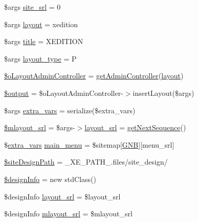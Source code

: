 \begin{DoxyCompactItemize}
\$args \hyperlink{ko_8install_8php_a8b1406b4ad1048041558dce6bfe89004}{site\+\_\+srl} = 0
\item 
\$args \hyperlink{ko_8install_8php_a0dc2cdff7167f362443808ff71ae5177}{layout} = \textquotesingle{}xedition\textquotesingle{}
\item 
\$args \hyperlink{ko_8install_8php_a5b072c5fd1d2228c6ba5cee13cd142e3}{title} = \textquotesingle{}X\+E\+D\+I\+T\+I\+ON\textquotesingle{}
\item 
\$args \hyperlink{ko_8install_8php_a0532d89570cfdaebc628afac2ff5a81b}{layout\+\_\+type} = \textquotesingle{}P\textquotesingle{}
\item 
\hyperlink{ko_8install_8php_a6a03496003da7df71cf94d9accb430be}{\$o\+Layout\+Admin\+Controller} = \hyperlink{func_8inc_8php_a2f7ca88a5226536aca3b2f5682bd7b2d}{get\+Admin\+Controller}(\textquotesingle{}\hyperlink{classlayout}{layout}\textquotesingle{})
\item 
\hyperlink{ko_8install_8php_a73004ce9cd673c1bfafd1dc351134797}{\$output} = \$o\+Layout\+Admin\+Controller-\/$>$insert\+Layout(\$args)
\item 
\$args \hyperlink{ko_8install_8php_ae1dcb37fc34a8f312d2e6abd6f806743}{extra\+\_\+vars} = serialize(\$extra\+\_\+vars)
\item 
\hyperlink{ko_8install_8php_a576210f0eec2e42df2c40e04a3972bb0}{\$mlayout\+\_\+srl} = \$args-\/$>$\hyperlink{ko_8install_8php_a70054876db09b2519a1726663c8dd9e7}{layout\+\_\+srl} = \hyperlink{func_8inc_8php_a5a97b458f9c5b4fe3574671840aee27c}{get\+Next\+Sequence}()
\item 
\$\hyperlink{ko_8install_8php_ae1dcb37fc34a8f312d2e6abd6f806743}{extra\+\_\+vars} \hyperlink{ko_8install_8php_ac71104c770b8ced3891f35849d3f2906}{main\+\_\+menu} = \$sitemap\mbox{[}\textquotesingle{}\hyperlink{ko_8install_8php_a9b1716b68fc04f3492448f38148dcbf5}{G\+NB}\textquotesingle{}\mbox{]}\mbox{[}\textquotesingle{}menu\+\_\+srl\textquotesingle{}\mbox{]}
\item 
\hyperlink{ko_8install_8php_a0b79a974b91157b79d83cc0be7e3247c}{\$site\+Design\+Path} = \+\_\+\+X\+E\+\_\+\+P\+A\+T\+H\+\_\+.\textquotesingle{}files/site\+\_\+design/\textquotesingle{}
\item 
\hyperlink{ko_8install_8php_a99e144f7d563ceb76b003d54739b3b0c}{\$design\+Info} = new std\+Class()
\item 
\$design\+Info \hyperlink{ko_8install_8php_a70054876db09b2519a1726663c8dd9e7}{layout\+\_\+srl} = \$layout\+\_\+srl
\item 
\$design\+Info \hyperlink{ko_8install_8php_a9cf497537007b08c645bed35f564be54}{mlayout\+\_\+srl} = \$mlayout\+\_\+srl

\end{DoxyCompactItemize}
